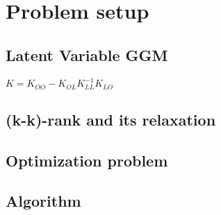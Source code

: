 \section{Problem setup}
\label{setup}

\subsection{Latent Variable GGM}

$K=K_{OO}-K_{OL}K_{LL}^{-1}K_{LO}$

\subsection{(k-k)-rank and its relaxation}

\subsection{Optimization problem}

\subsection{Algorithm}
 
